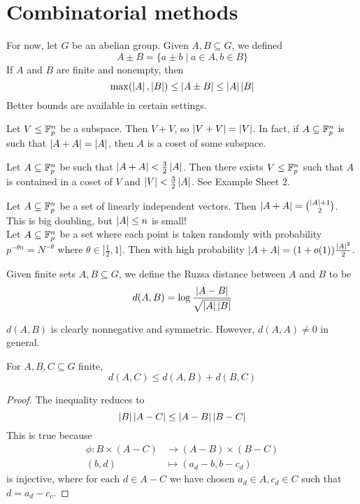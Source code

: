 \documentclass{article}
\begin{document}
\clearpage
\section{Combinatorial methods}

For now, let $G$ be an abelian group. Given $A, B \subseteq G$, we defined
$$A \pm B = \{a \pm b \mid a \in A, b \in B\}$$
If $A$ and $B$ are finite and nonempty, then
$$\max(\left\lvert A\right\rvert, \left\lvert B\right\rvert) \le \left\lvert A \pm B\right\rvert \le \left\lvert A\right\rvert\left\lvert B\right\rvert$$
Better bounds are available in certain settings.

\begin{eg}
  Let $V \le \mathbb F_p^n$ be a subspace. Then $V + V$, so $\left\lvert V + V\right\rvert = \left\lvert V\right\rvert$. In fact, if $A \subseteq \mathbb F_p^n$ is such that $\left\lvert A + A\right\rvert = \left\lvert A\right\rvert$, then $A$ is a coset of some subspace.
\end{eg}

\begin{eg}\label{ex:doubling-lt-three-halves}
  Let $A \subseteq \mathbb F_p^n$ be such that $\left\lvert A + A\right\rvert < \frac 32 \left\lvert A\right\rvert$. Then there exists $V \le \mathbb F_p^n$ such that $A$ is contained in a coset of $V$ and $\left\lvert V\right\rvert < \frac 32\left\lvert A\right\rvert$. See Example Sheet 2.
\end{eg}

\begin{eg}
  Let $A \subseteq \mathbb F_p^n$ be a set of linearly independent vectors. Then $\left\lvert A + A\right\rvert = \binom{\left\lvert A\right\rvert + 1}2$. This is big doubling, but $\left\lvert A\right\rvert \le n$ is small! \\
  Let $A \subseteq \mathbb F_p^n$ be a set where each point is taken randomly with probability $p^{-\theta n} = N^{-\theta}$ where $\theta \in ]\frac 12, 1]$. Then with high probability $\left\lvert A + A\right\rvert = (1 + o(1))\frac{\left\lvert A\right\rvert^2}2$.
\end{eg}

\begin{dfn}
  Given finite sets $A, B \subseteq G$, we define the Ruzsa distance between $A$ and $B$ to be
  $$d(A, B) = \log \frac{\left\lvert A - B\right\rvert}{\sqrt{\left\lvert A\right\rvert\left\lvert B\right\rvert}}$$
\end{dfn}

$d(A, B)$ is clearly nonnegative and symmetric. However, $d(A, A) \ne 0$ in general.

\begin{lem}\label{lem:ruzsa-triangle}
  For $A, B, C \subseteq G$ finite,
  $$d(A, C) \le d(A, B) + d(B, C)$$
\end{lem}
\begin{proof}
  The inequality reduces to
  $$\left\lvert B\right\rvert\left\lvert A - C\right\rvert \le \left\lvert A - B\right\rvert\left\lvert B - C\right\rvert$$
  This is true because
  \begin{align*}
    \phi : B \times (A - C) & \to (A - B) \times (B - C) \\
    (b, d) & \mapsto (a_d - b, b - c_d)
  \end{align*}
  is injective, where for each $d \in A - C$ we have chosen $a_d \in A, c_d \in C$ such that $d = a_d - c_c$.
\end{proof}
\end{document}

